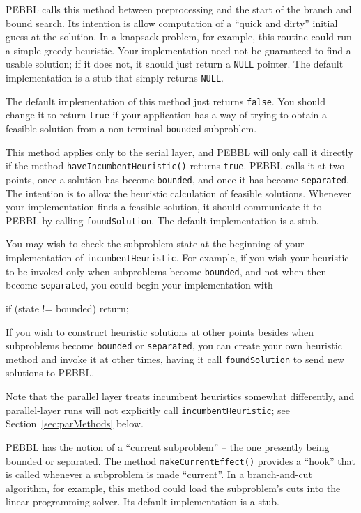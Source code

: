  PEBBL calls this method
between preprocessing and the start of the branch and bound search.
Its intention is allow computation of a ``quick and dirty'' initial
guess at the solution.  In a knapsack problem, for example, this
routine could run a simple greedy heuristic.  Your implementation need
not be guaranteed to find a usable solution; if it does not, it should
just return a \texttt{NULL} pointer.  The default implementation is a
stub that simply returns \texttt{NULL}.

The default implementation of this method just returns \texttt{false}.
You should change it to return \texttt{true} if your application has a
way of trying to obtain a feasible solution from a non-terminal
\texttt{bounded} subproblem.  

This method applies only to the serial layer, and PEBBL will only call
it directly if the method \texttt{haveIncumbentHeuristic()} returns
\texttt{true}.  PEBBL calls it at two points, once a solution has
become \texttt{bounded}, and once it has become \texttt{separated}. 
The intention is to allow the heuristic calculation of feasible
solutions.  Whenever your implementation finds a feasible solution, it
should communicate it to PEBBL by calling \texttt{foundSolution}.  The
default implementation is a stub.

You may wish to check the subproblem state at the beginning of your
implementation of \texttt{incumbentHeuristic}.  For example, if you
wish your heuristic to be invoked only when subproblems become
\texttt{bounded}, and not when then become \texttt{separated}, you
could begin your implementation with
\begin{codeblock}
if (state != bounded) return;
\end{codeblock}
If you wish to construct heuristic solutions at other points besides
when subproblems become \texttt{bounded} or \texttt{separated}, you
can create your own heuristic method and invoke it at other times,
having it call \texttt{foundSolution} to send new solutions to PEBBL.

Note that the parallel layer treats incumbent heuristics somewhat
differently, and parallel-layer runs will not explicitly call
\texttt{incumbentHeuristic}; see Section~\ref{sec:parMethods} below.
 
 PEBBL has the notion of a
``current subproblem'' -- the one presently being bounded or
separated.  The method \texttt{makeCurrentEffect()} provides a
``hook'' that is called whenever a subproblem is made ``current''.  In
a branch-and-cut algorithm, for example, this method could load the
subproblem's cuts into the linear programming solver.  Its default
implementation is a stub.

